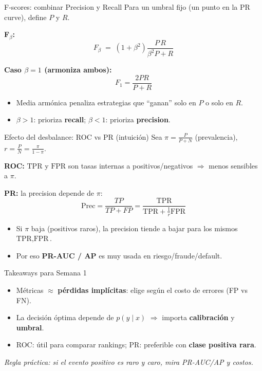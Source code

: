 \begin{frame}{F-scores: combinar Precision y Recall}
Para un umbral fijo (un punto en la PR curve), define \(P\) y \(R\).

\textbf{F\(_\beta\):}
\[
F_\beta \;=\; (1+\beta^2)\frac{P\,R}{\beta^2 P + R}
\]

\textbf{Caso \(\beta=1\) (armoniza ambos):}
\[
F_1=\frac{2PR}{P+R}
\]

\begin{itemize}
  \item Media armónica penaliza estrategias que “ganan” solo en \(P\) o solo en \(R\).
  \item \(\beta>1\): prioriza \textbf{recall}; \(\beta<1\): prioriza \textbf{precision}.
\end{itemize}
\end{frame}

\begin{frame}{Efecto del desbalance: ROC vs PR (intuición)}
Sea \(\pi=\frac{P}{P+N}\) (prevalencia), \(r=\frac{P}{N}=\frac{\pi}{1-\pi}\).

\textbf{ROC:} \(\text{TPR}\) y \(\text{FPR}\) son tasas internas a positivos/negativos \(\Rightarrow\) menos sensibles a \(\pi\).

\textbf{PR:} la precision depende de \(\pi\):
\[
\text{Prec}=\frac{TP}{TP+FP}
=\frac{\text{TPR}}{\text{TPR}+\frac{1}{r}\text{FPR}}
\]
\begin{itemize}
  \item Si \(\pi\) baja (positivos raros), la precision tiende a bajar para los mismos \(\text{TPR},\text{FPR}\).
  \item Por eso \textbf{PR-AUC / AP} es muy usada en riesgo/fraude/default.
\end{itemize}
\end{frame}

\begin{frame}{Takeaways para Semana 1}
\begin{itemize}
  \item Métricas \(\approx\) \textbf{pérdidas implícitas}: elige según el costo de errores (FP vs FN).
  \item La decisión óptima depende de \(p(y\mid x)\) \(\Rightarrow\) importa \textbf{calibración} y \textbf{umbral}.
  \item ROC: útil para comparar rankings; PR: preferible con \textbf{clase positiva rara}.
\end{itemize}

\vspace{0.6em}
\centering
\textit{Regla práctica: si el evento positivo es raro y caro, mira PR-AUC/AP y costos.}
\end{frame}
